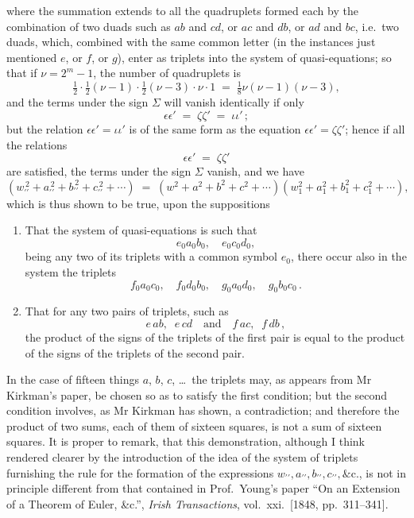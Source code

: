 \documentclass[11pt]{article}
\begin{document}
where the summation extends to all the quadruplets formed each by the combination of two duads such as $ab$ and $cd$, or $ac$ and $db$, or $ad$ and $bc$, i.e.\ two duads, which, combined with the same common letter (in the instances just mentioned $e$, or $f$, or $g$), enter as triplets into the system of quasi-equations; so that if $\nu = 2^{m} - 1$, the number of quadruplets is
\[
\tfrac{1}{2}\cdot\tfrac{1}{2}(\nu-1)\cdot\tfrac{1}{2}(\nu-3)\cdot\nu\cdot 1 \;=\; \tfrac{1}{8}\nu(\nu-1)(\nu-3),
\]
and the terms under the sign $\Sigma$ will vanish identically if only
\[
\epsilon\epsilon' \;=\; \zeta\zeta' \;=\; \iota\iota'\,;
\]
but the relation $\epsilon\epsilon' = \iota\iota'$ is of the same form as the equation $\epsilon\epsilon' = \zeta\zeta'$; hence if all the relations
\[
\epsilon\epsilon' \;=\; \zeta\zeta'
\]
are satisfied, the terms under the sign $\Sigma$ vanish, and we have
\[
(w_{\prime\prime}^{\,2} + a_{\prime\prime}^{\,2} + b_{\prime\prime}^{\,2} + c_{\prime\prime}^{\,2} + \cdots)
\;=\; (w^{2} + a^{2} + b^{2} + c^{2} + \cdots)(w_{1}^{2} + a_{1}^{2} + b_{1}^{2} + c_{1}^{2} + \cdots),
\]
which is thus shown to be true, upon the suppositions
\begin{enumerate}
\item[1.] That the system of quasi-equations is such that
\[
e_{0} a_{0} b_{0},\quad e_{0} c_{0} d_{0},
\]
being any two of its triplets with a common symbol $e_{0}$, there occur also in the system the triplets
\[
f_{0} a_{0} c_{0},\quad f_{0} d_{0} b_{0},\quad g_{0} a_{0} d_{0},\quad g_{0} b_{0} c_{0}\,.
\]
\item[2.] That for any two pairs of triplets, such as
\[
e\,ab,\;\; e\,cd \quad\text{and}\quad f\,ac,\;\; f\,db\,,
\]
the product of the signs of the triplets of the first pair is equal to the product of the signs of the triplets of the second pair.
\end{enumerate}

In the case of fifteen things $a$, $b$, $c$, \ldots\ the triplets may, as appears from Mr Kirkman's paper, be chosen so as to satisfy the first condition; but the second condition involves, as Mr Kirkman has shown, a contradiction; and therefore the product of two sums, each of them of sixteen squares, is not a sum of sixteen squares. It is proper to remark, that this demonstration, although I think rendered clearer by the introduction of the idea of the system of triplets furnishing the rule for the formation of the expressions $w_{\prime\prime}, a_{\prime\prime}, b_{\prime\prime}, c_{\prime\prime}, \&\text{c.}$, is not in principle different from that contained in Prof.\ Young's paper ``On an Extension of a Theorem of Euler, \&c.'', \emph{Irish Transactions}, vol.\ xxi.\ [1848, pp.\ 311--341].
\end{document}
